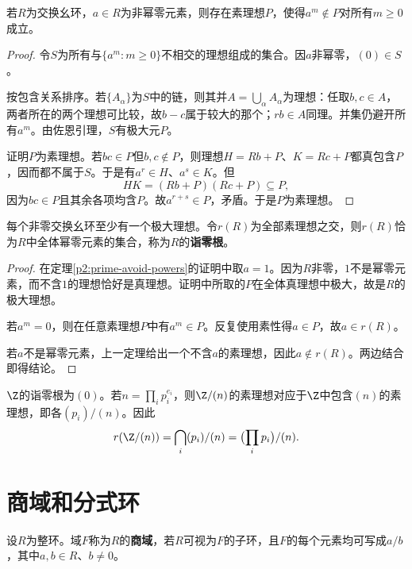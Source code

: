 \begin{theorem}\label{p2:prime-avoid-powers}
若$R$为交换幺环，$a\in R$为非幂零元素，则存在素理想$P$，使得$a^m\notin P$对所有$m\geq0$成立。
\end{theorem}
\begin{proof}
令$S$为所有与$\{a^m:m\geq0\}$不相交的理想组成的集合。因$a$非幂零，$(0)\in S$。

按包含关系排序。若$\{A_\alpha\}$为$S$中的链，则其并$A=\bigcup_\alpha A_\alpha$为理想：任取$b,c\in A$，两者所在的两个理想可比较，故$b-c$属于较大的那个；$rb\in A$同理。并集仍避开所有$a^m$。由佐恩引理，$S$有极大元$P$。

证明$P$为素理想。若$bc\in P$但$b,c\notin P$，则理想$H=Rb+P$、$K=Rc+P$都真包含$P$，因而都不属于$S$。于是有$a^r\in H$、$a^s\in K$。但
\[
HK=(Rb+P)(Rc+P)\subseteq P,
\]
因为$bc\in P$且其余各项均含$P$。故$a^{r+s}\in P$，矛盾。于是$P$为素理想。
\end{proof}

\begin{corollary}
每个非零交换幺环至少有一个极大理想。令$r(R)$为全部素理想之交，则$r(R)$恰为$R$中全体幂零元素的集合，称为$R$的\textbf{诣零根}。
\end{corollary}
\begin{proof}
在定理\ref{p2:prime-avoid-powers}的证明中取$a=1$。因为$R$非零，$1$不是幂零元素，而不含$1$的理想恰好是真理想。证明中所取的$P$在全体真理想中极大，故是$R$的极大理想。

若$a^m=0$，则在任意素理想$P$中有$a^m\in P$。反复使用素性得$a\in P$，故$a\in r(R)$。

若$a$不是幂零元素，上一定理给出一个不含$a$的素理想，因此$a\notin r(R)$。两边结合即得结论。
\end{proof}

\begin{example}
$\Z$的诣零根为$(0)$。若$n=\prod_i p_i^{e_i}$，则$\Z/(n)$的素理想对应于$\Z$中包含$(n)$的素理想，即各$(p_i)/(n)$。因此
\[
r(\Z/(n))=\bigcap_i(p_i)/(n)=\bigl(\prod_i p_i\bigr)/(n).
\]
\end{example}

\section{商域和分式环}

\begin{definition}
设$R$为整环。域$F$称为$R$的\textbf{商域}，若$R$可视为$F$的子环，且$F$的每个元素均可写成$a/b$，其中$a,b\in R$、$b\ne0$。
\end{definition}

